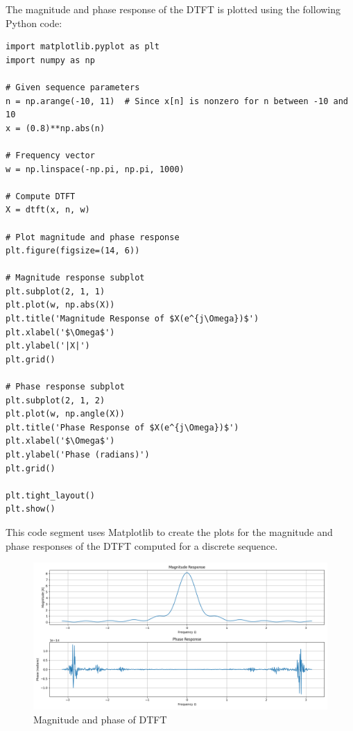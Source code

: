 
\item[(b)]
The magnitude and phase response of the DTFT is plotted using the following Python code:

\begin{verbatim}
import matplotlib.pyplot as plt
import numpy as np

# Given sequence parameters
n = np.arange(-10, 11)  # Since x[n] is nonzero for n between -10 and 10
x = (0.8)**np.abs(n)

# Frequency vector
w = np.linspace(-np.pi, np.pi, 1000)

# Compute DTFT
X = dtft(x, n, w)

# Plot magnitude and phase response
plt.figure(figsize=(14, 6))

# Magnitude response subplot
plt.subplot(2, 1, 1)
plt.plot(w, np.abs(X))
plt.title('Magnitude Response of $X(e^{j\Omega})$')
plt.xlabel('$\Omega$')
plt.ylabel('|X|')
plt.grid()

# Phase response subplot
plt.subplot(2, 1, 2)
plt.plot(w, np.angle(X))
plt.title('Phase Response of $X(e^{j\Omega})$')
plt.xlabel('$\Omega$')
plt.ylabel('Phase (radians)')
plt.grid()

plt.tight_layout()
plt.show()
\end{verbatim}

This code segment uses Matplotlib to create the plots for the magnitude and phase responses
of the DTFT computed for a discrete sequence.

\begin{figure}[h]
\centering
\includegraphics[width=\textwidth]{fig/ex4_b_plot}
\caption{Magnitude and phase of DTFT}
\label{fig:ex4_b_plot}
\end{figure}
